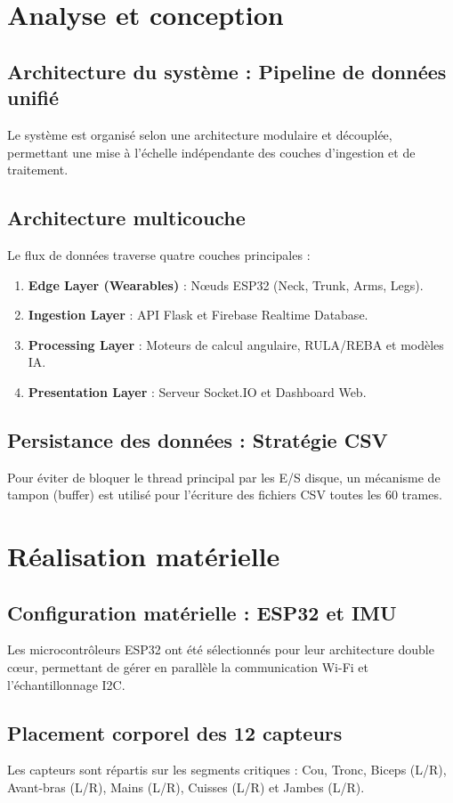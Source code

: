 \documentclass[12pt,a4paper]{report}
\begin{document}
\chapter{Analyse et conception}
\section{Architecture du système : Pipeline de données unifié}
Le système est organisé selon une architecture modulaire et découplée, permettant une mise à l'échelle indépendante des couches d'ingestion et de traitement.

\section{Architecture multicouche}
Le flux de données traverse quatre couches principales :
\begin{enumerate}
    \item \textbf{Edge Layer (Wearables)} : Nœuds ESP32 (Neck, Trunk, Arms, Legs).
    \item \textbf{Ingestion Layer} : API Flask et Firebase Realtime Database.
    \item \textbf{Processing Layer} : Moteurs de calcul angulaire, RULA/REBA et modèles IA.
    \item \textbf{Presentation Layer} : Serveur Socket.IO et Dashboard Web.
\end{enumerate}

\section{Persistance des données : Stratégie CSV}
Pour éviter de bloquer le thread principal par les E/S disque, un mécanisme de tampon (buffer) est utilisé pour l'écriture des fichiers CSV toutes les 60 trames.

\chapter{Réalisation matérielle}
\section{Configuration matérielle : ESP32 et IMU}
Les microcontrôleurs ESP32 ont été sélectionnés pour leur architecture double cœur, permettant de gérer en parallèle la communication Wi-Fi et l'échantillonnage I2C.

\section{Placement corporel des 12 capteurs}
Les capteurs sont répartis sur les segments critiques : Cou, Tronc, Biceps (L/R), Avant-bras (L/R), Mains (L/R), Cuisses (L/R) et Jambes (L/R).
\end{document}
